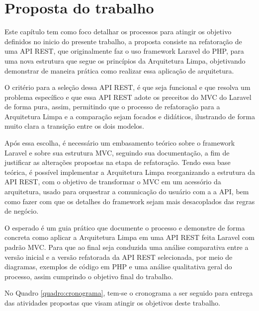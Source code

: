 \chapter{Proposta do trabalho}

    \par Este capítulo tem como foco detalhar os processos para atingir os objetivo definidos no inicio do presente trabalho, a proposta consiste na refatoração de uma API REST, que originalmente faz o uso framework Laravel do PHP, para uma nova estrutura que segue os princípios da Arquitetura Limpa, objetivando demonstrar de maneira prática como realizar essa aplicação de arquitetura.
    
    \par O critério para a seleção dessa API REST, é que seja funcional e que resolva um problema específico e que essa API REST adote os preceitos do MVC do Laravel de forma pura, assim, permitindo que o processo de refatoração para a Arquitetura Limpa e a comparação sejam focados e didáticos, ilustrando de forma muito clara a transição entre os dois modelos.

    \par Após essa escolha, é necessário um embasamento teórico sobre o framework Laravel e sobre sua estrutura MVC, seguindo sua documentação, a fim de justificar as alterações propostas na etapa de refatoração. Tendo essa base teórica, é possível implementar a Arquitetura Limpa reorganizando a estrutura da API REST, com o objetivo de transformar o MVC em um acessório da arquitetura, usado para orquestrar a comunicação do usuário com a a API, bem como fazer com que os detalhes do framework sejam mais desacoplados das regras de negócio.

    \par O esperado é um guia prático que documente o processo e demonstre de forma concreta como aplicar a Arquitetura Limpa em uma API REST feita Laravel com padrão MVC. Para que ao final seja conduzida uma análise comparativa entre a versão inicial e a versão refatorada da API REST selecionada, por meio de diagramas, exemplos de código em PHP e uma análise qualitativa geral do processo, assim cumprindo o objetivo final do trabalho.

    \par No Quadro \ref{quadro:cronograma}, tem-se o cronograma a ser seguido para entrega das atividades propostas que visam atingir os objetivos deste trabalho.

\captionsetup{labelsep=endash, justification=centering}

